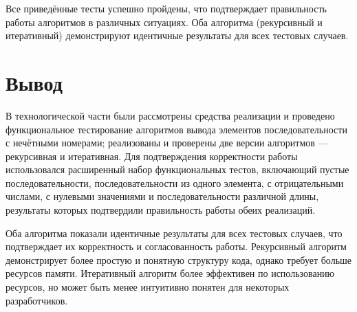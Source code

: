 Все приведённые тесты успешно пройдены, что подтверждает правильность работы алгоритмов в различных ситуациях. Оба алгоритма (рекурсивный и итеративный) демонстрируют идентичные результаты для всех тестовых случаев.

\section*{Вывод}

В технологической части были рассмотрены средства реализации и проведено функциональное тестирование алгоритмов вывода элементов последовательности с нечётными номерами; реализованы и проверены две версии алгоритмов --- рекурсивная и итеративная. Для подтверждения корректности работы использовался расширенный набор функциональных тестов, включающий пустые последовательности, последовательности из одного элемента, с отрицательными числами, с нулевыми значениями и последовательности различной длины, результаты которых подтвердили правильность работы обеих реализаций.

Оба алгоритма показали идентичные результаты для всех тестовых случаев, что подтверждает их корректность и согласованность работы. Рекурсивный алгоритм демонстрирует более простую и понятную структуру кода, однако требует больше ресурсов памяти. Итеративный алгоритм более эффективен по использованию ресурсов, но может быть менее интуитивно понятен для некоторых разработчиков.

\clearpage


